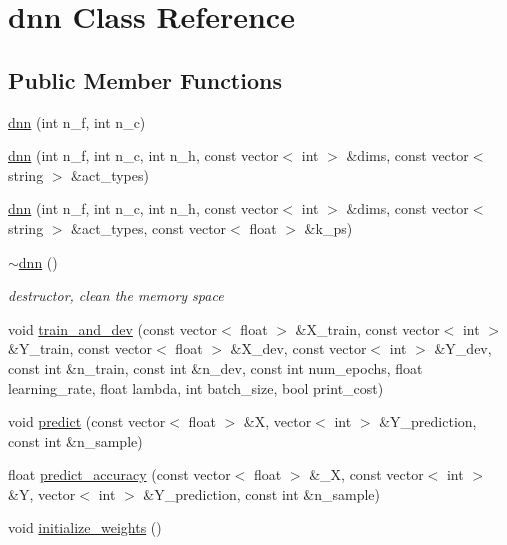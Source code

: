 \hypertarget{classdnn}{}\section{dnn Class Reference}
\label{classdnn}
\subsection*{Public Member Functions}
\begin{DoxyCompactItemize}
\item 
\hyperlink{classdnn_ab6d436cbc35d10258bd8d3e314cb36b8}{dnn} (int n\+\_\+f, int n\+\_\+c)
\item 
\hyperlink{classdnn_aae6e714fc63cc1b73b40510e5a3401c7}{dnn} (int n\+\_\+f, int n\+\_\+c, int n\+\_\+h, const vector$<$ int $>$ \&dims, const vector$<$ string $>$ \&act\+\_\+types)
\item 
\hyperlink{classdnn_a657974689367069e38e600c594a461f0}{dnn} (int n\+\_\+f, int n\+\_\+c, int n\+\_\+h, const vector$<$ int $>$ \&dims, const vector$<$ string $>$ \&act\+\_\+types, const vector$<$ float $>$ \&k\+\_\+ps)
\item 
\mbox{\label{classdnn_a3384dfd89ac2e10f6554e05a53b288ad}} 
\hyperlink{classdnn_a3384dfd89ac2e10f6554e05a53b288ad}{$\sim$dnn} ()
\begin{DoxyCompactList}\small\item\em destructor, clean the memory space \end{DoxyCompactList}\item 
void \hyperlink{classdnn_a9377e30990622d77b1ca09c1b1ab6f8a}{train\+\_\+and\+\_\+dev} (const vector$<$ float $>$ \&X\+\_\+train, const vector$<$ int $>$ \&Y\+\_\+train, const vector$<$ float $>$ \&X\+\_\+dev, const vector$<$ int $>$ \&Y\+\_\+dev, const int \&n\+\_\+train, const int \&n\+\_\+dev, const int num\+\_\+epochs, float learning\+\_\+rate, float lambda, int batch\+\_\+size, bool print\+\_\+cost)
\item 
void \hyperlink{classdnn_a9809de12b4182b61b98e652b0e61856c}{predict} (const vector$<$ float $>$ \&X, vector$<$ int $>$ \&Y\+\_\+prediction, const int \&n\+\_\+sample)
\item 
float \hyperlink{classdnn_a7f12d5a496ec38e1b4def98908e32236}{predict\+\_\+accuracy} (const vector$<$ float $>$ \&\+\_\+X, const vector$<$ int $>$ \&Y, vector$<$ int $>$ \&Y\+\_\+prediction, const int \&n\+\_\+sample)
\item 
void \hyperlink{classdnn_aea2749931a0cb4bd48112371852633a9}{initialize\+\_\+weights} ()

\end{DoxyCompactItemize}
